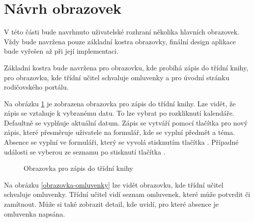 \section{Návrh obrazovek}
V této části bude navrhnuto uživatelské rozhraní několika hlavních obrazovek. Vždy bude navržena pouze základní kostra obrazovky, finální design aplikace bude vyřešen až při její implementaci.

Základní kostra bude navržena pro obrazovku, kde probíhá zápis do třídní knihy, pro obrazovku, kde třídní učitel schvaluje omluvenky a pro úvodní stránku rodičovského portálu.
\clearpage

Na obrázku \ref{obrazovka-zapis} je zobrazena obrazovka pro zápis do třídní knihy. Lze vidět, že zápis se vztahuje k vybranému datu. To lze vybrat po rozkliknutí kalendáře. Defaultně se vyplňuje aktuální datum. Zápis se vytváří pomocí tlačítka pro nový zápis, které přesměruje uživatele na formulář, kde se vyplní předmět a téma. Absence se vyplní ve formuláři, který se vyvolá stisknutím tlačítka . Případné události se vyberou ze seznamu po stisknutí tlačítka .

\begin{figure}[h]
	\centering
	\caption{Obrazovka pro zápis do třídní knihy}
	\label{obrazovka-zapis}
\end{figure}

Na obrázku \ref{obrazovka-omluvenky} lze vidět obrazovku, kde třídní učitel schvaluje omluvenky. Třídní učitel vidí seznam omluvenek, které může potvrdit či zamítnout. Může si také zobrazit detail, kde uvidí, pro které absence je omluvenka napsána.
\clearpage

